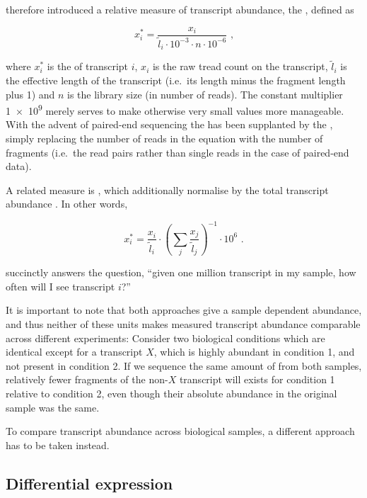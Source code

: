 \cite{Mortazavi:2008} therefore introduced a relative measure of transcript
abundance, the \rpkm, defined as

\begin{equation}
    x^*_i = \frac{x_i}{\tilde l_i \cdot 10^{-3} \cdot n \cdot 10^{-6}}
        \text{\ ,}
\end{equation}

where \(x^*_i\) is the \rpkm of transcript \(i\), \(x_i\) is the raw tread count
on the transcript, \(\tilde l_i\) is the effective length of the transcript
(i.e.\ its length minus the fragment length plus \num{1}) and \(n\) is the
library size (in number of reads). The constant multiplier \num{1e9} merely
serves to make otherwise very small values more manageable. With the advent of
paired-end sequencing the \rpkm has been supplanted by the \fpkm, simply
replacing the number of reads in the equation with the number of fragments
(i.e.\ the read pairs rather than single reads in the case of paired-end data).

A related measure is \tpm, which additionally normalise by the total transcript
abundance \citep{Li:2010}. In other words,

\begin{equation}
    x^*_i = \frac{x_i}{\tilde l_i} \cdot \left(\sum_j{\frac{x_j}{\tilde
        l_j}}\right)^{-1} \cdot 10^6 \text{\ .}
\end{equation}

\tpm succinctly answers the question, “given one million transcript in my
sample, how often will I see transcript \(i\)?”

It is important to note that both approaches give a sample dependent abundance,
and thus neither of these units makes measured transcript abundance comparable
across different experiments: Consider two biological conditions which are
identical except for a transcript \(X\), which is highly abundant in condition
\num{1}, and not present in condition \num{2}. If we sequence the same amount of
\mrna from both samples, relatively fewer fragments of the non-\(X\) transcript
will exists for condition \num{1} relative to condition \num{2}, even though
their absolute abundance in the original sample was the same.

To compare transcript abundance across biological samples, a different approach
has to be taken instead.

\subsection{Differential expression}

